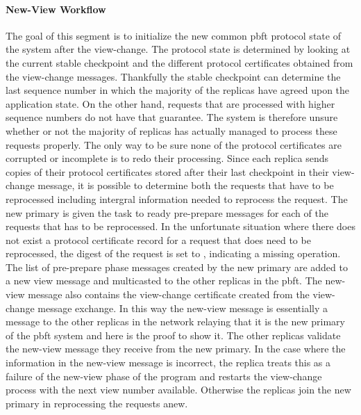 \paragraph{New-View Workflow}
\vspace{1cm}

The goal of this segment is to initialize the new common \ac{pbft} protocol state of the system after the view-change. The protocol state is determined by looking at the current stable checkpoint and the different protocol certificates obtained from the view-change messages. Thankfully the stable checkpoint can determine the last sequence number in which the majority of the replicas have agreed upon the application state. On the other hand, requests that are processed with higher sequence numbers do not have that guarantee. The system is therefore unsure whether or not the majority of replicas has actually managed to process these requests properly. The only way to be sure none of the protocol certificates are corrupted or incomplete is to redo their processing. Since each replica sends copies of their protocol certificates stored after their last checkpoint in their view-change message,  it is possible to determine both the requests that have to be reprocessed including intergral information needed to reprocess the request. The new primary is given the task to ready pre-prepare messages for each of the requests that has to be reprocessed. In the unfortunate situation where there does not exist a protocol certificate record for a request that does need to be reprocessed, the digest of the request is set to , indicating a missing operation. The list of pre-prepare phase messages created by the new primary are added to a new view message and multicasted to the other replicas in the \ac{pbft}. The new-view message also contains the view-change certificate created from the view-change message exchange. In this way the new-view message is essentially a message to the other replicas in the network relaying that it is the new primary of the \ac{pbft} system and here is the proof to show it. The other replicas validate the new-view message they receive from the new primary. In the case where the information in the new-view message is incorrect, the replica treats this as a failure of the new-view phase of the program and restarts the view-change process with the next view number available. Otherwise the replicas join the new primary in reprocessing the requests anew. 

